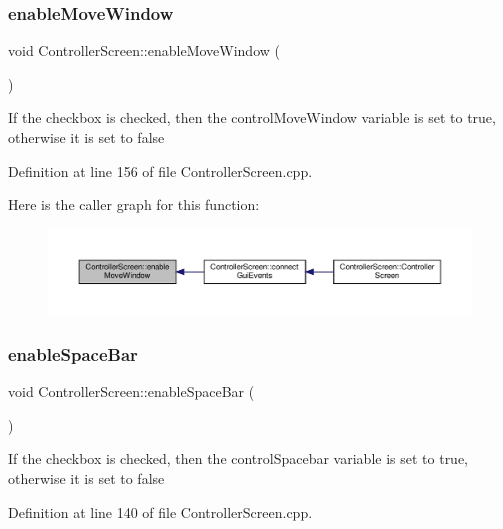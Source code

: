 \subsubsection{\texorpdfstring{enable\+Move\+Window}{enableMoveWindow}}
{\footnotesize\ttfamily void Controller\+Screen\+::enable\+Move\+Window (\begin{DoxyParamCaption}{ }\end{DoxyParamCaption})\hspace{0.3cm}{\ttfamily [slot]}}

If the checkbox is checked, then the control\+Move\+Window variable is set to true, otherwise it is set to false 

Definition at line 156 of file Controller\+Screen.\+cpp.

Here is the caller graph for this function\+:
\nopagebreak
\begin{figure}[H]
\begin{center}
\leavevmode
\includegraphics[width=350pt]{class_controller_screen_a90e6dcfb4a0dfb2e845890bba3f208f5_icgraph}
\end{center}
\end{figure}
\mbox{\label{class_controller_screen_aa75c31cfb62427bba649b30e58130bfc}} 
\subsubsection{\texorpdfstring{enable\+Space\+Bar}{enableSpaceBar}}
{\footnotesize\ttfamily void Controller\+Screen\+::enable\+Space\+Bar (\begin{DoxyParamCaption}{ }\end{DoxyParamCaption})\hspace{0.3cm}{\ttfamily [slot]}}

If the checkbox is checked, then the control\+Spacebar variable is set to true, otherwise it is set to false 

Definition at line 140 of file Controller\+Screen.\+cpp.

